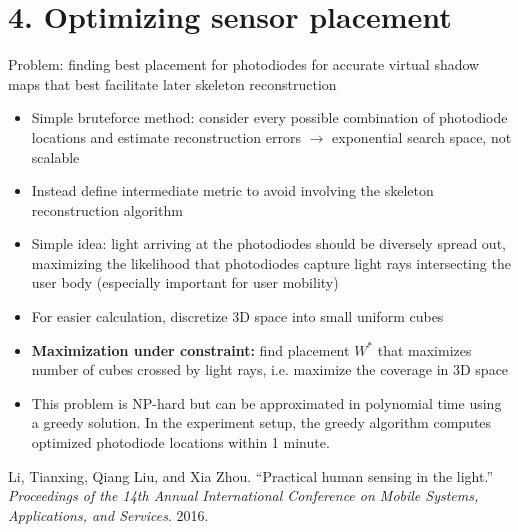 \documentclass[12pt]{article}
\begin{document}
\noindent
\section*{4. Optimizing sensor placement}

Problem: finding best placement for photodiodes for accurate virtual shadow maps that best facilitate later skeleton reconstruction

\begin{itemize}
    \setlength\itemsep{1em}
    \vspace{0.5cm}
    
    \item Simple bruteforce method: consider every possible combination of photodiode locations and estimate reconstruction errors $\rightarrow$ exponential search space, not scalable
    
    \item Instead define intermediate metric to avoid involving the skeleton reconstruction algorithm
    
    \item Simple idea: light arriving at the photodiodes should be diversely spread out, maximizing the likelihood that photodiodes capture light rays intersecting the user body (especially important for user mobility)
    
    \item For easier calculation, discretize 3D space into small uniform cubes
    
    \item \textbf{Maximization under constraint:} find placement $W^*$ that maximizes number of cubes crossed by light rays, i.e. maximize the coverage in 3D space
    
    \item This problem is NP-hard but can be approximated in polynomial time using a greedy solution. In the experiment setup, the greedy algorithm computes optimized photodiode locations within 1 minute.
\end{itemize}

\begin{thebibliography}{9}
Li, Tianxing, Qiang Liu, and Xia Zhou. ``Practical human sensing in the light.'' \emph{Proceedings of the 14th Annual International Conference on Mobile Systems, Applications, and Services}. 2016.
\end{thebibliography}
\end{document}
